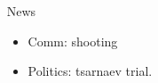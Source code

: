 \documentclass[serif, mathserif, final]{beamer}
\begin{document}
\begin{frame}{}
\begin{columns}
\begin{column}{0.50\linewidth}
\begin{block}
\begin{calendar}{\hsize}


\day{}{ %
}


\day{}{} %

\finishCalendar %
\end{calendar}
\end{block}

\end{column}%

\begin{column}{0.20\linewidth}
\begin{block}{News}
  \begin{itemize} 
    \tiny \item \tiny Comm: shooting
  \item \tiny Politics: tsarnaev trial.
  \end{itemize}
\end{block}
  

\end{column}
\end{columns}
\end{frame}
\end{document}
